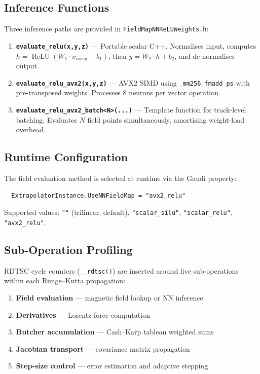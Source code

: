 \documentclass[11pt,a4paper]{article}
\DeclareMathOperator{\ReLU}{ReLU}
\begin{document}
\subsection{Inference Functions}

Three inference paths are provided in \texttt{FieldMapNNReLUWeights.h}:

\begin{enumerate}
  \item \textbf{\texttt{evaluate\_relu(x,y,z)}} --- Portable scalar C++.
        Normalises input, computes $h = \ReLU(W_1 \cdot x_\mathrm{norm} + b_1)$,
        then $y = W_2 \cdot h + b_2$, and de-normalises output.

  \item \textbf{\texttt{evaluate\_relu\_avx2(x,y,z)}} --- AVX2 SIMD using
        \texttt{\_mm256\_fmadd\_ps} with pre-transposed weights. Processes
        8 neurons per vector operation.

  \item \textbf{\texttt{evaluate\_relu\_avx2\_batch<N>(...)}} --- Template
        function for track-level batching. Evaluates $N$ field points
        simultaneously, amortising weight-load overhead.
\end{enumerate}

\subsection{Runtime Configuration}

The field evaluation method is selected at runtime via the Gaudi property:
\begin{verbatim}
  ExtrapolatorInstance.UseNNFieldMap = "avx2_relu"
\end{verbatim}
Supported values: \texttt{""} (trilinear, default), \texttt{"scalar\_silu"},
\texttt{"scalar\_relu"}, \texttt{"avx2\_relu"}.

\subsection{Sub-Operation Profiling}

RDTSC cycle counters (\texttt{\_\_rdtsc()}) are inserted around five
sub-operations within each Runge--Kutta propagation:

\begin{enumerate}[nosep]
  \item \textbf{Field evaluation} --- magnetic field lookup or NN inference
  \item \textbf{Derivatives} --- Lorentz force computation
  \item \textbf{Butcher accumulation} --- Cash--Karp tableau weighted sums
  \item \textbf{Jacobian transport} --- covariance matrix propagation
  \item \textbf{Step-size control} --- error estimation and adaptive stepping
\end{enumerate}
\end{document}
